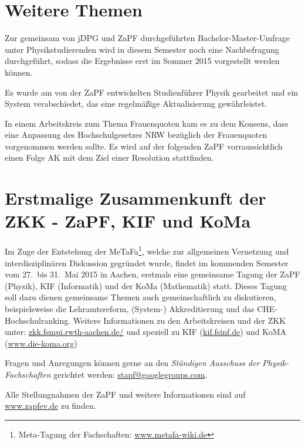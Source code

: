 \documentclass{scrartcl}
\begin{document}
\section*{Weitere Themen}

Zur gemeinsam von jDPG und ZaPF durchgeführten Bachelor-Master-Umfrage unter Physikstudierenden wird in diesem Semester noch eine Nachbefragung durchgeführt, sodass die Ergebnisse erst im Sommer 2015 vorgestellt werden können.

Es wurde am von der ZaPF entwickelten Studienführer Physik gearbeitet und ein System verabschiedet, das eine regelmäßige Aktualisierung gewährleistet.

In einem Arbeitskreis zum Thema Frauenquoten kam es zu dem Konsens, dass eine Anpassung des Hochschulgesetzes NRW bezüglich der Frauenquoten vorgenommen werden sollte. Es wird auf der folgenden ZaPF vorraussichtlich einen Folge AK mit dem Ziel einer Resolution stattfinden.


\section*{Erstmalige Zusammenkunft der ZKK - ZaPF, KIF und KoMa}
Im Zuge der Entstehung der MeTaFa\footnote{Meta-Tagung der Fachschaften: \href{http://metafa-wiki.de}{\url{www.metafa-wiki.de}}}, welche zur allgemeinen  Vernetzung und interdisziplinären Diskussion gegründet wurde, findet im kommenden Semester  vom 27.\ bis 31.\ Mai 2015 in Aachen, erstmals eine gemeinsame Tagung der  ZaPF (Physik), KIF (Informatik) und der KoMa (Mathematik) statt. Dieses Tagung soll dazu dienen gemeinsame Themen auch gemeinschaftlich zu diskutieren, beispielsweise die Lehramtsreform, (System-) Akkreditierung und das CHE-Hochschulranking. 
Weitere Informationen zu den Arbeitskreisen und der ZKK unter: \href{zkk.fsmpi.rwth-aachen.de/}{\url{zkk.fsmpi.rwth-aachen.de/}} und speziell zu KIF (\href{https://kif.fsinf.de}{\url{kif.fsinf.de}}) und KoMA (\href{http://www.die-koma.org/}{\url{www.die-koma.org}})


\vspace{0.5cm}
Fragen und Anregungen k\"onnen gerne an den \emph{St\"andigen Ausschuss der Physik-Fachschaften} gerichtet werden:
\href{mailto:stapf@googlegroups.com}{\url{stapf@googlegroups.com}}. 

Alle Stellungnahmen der ZaPF und weitere Informationen sind auf \href{http://www.zapfev.de}{\url{www.zapfev.de}} zu finden.
\end{document}
